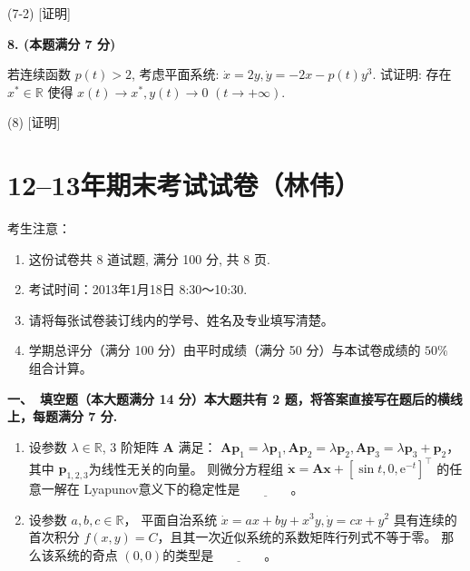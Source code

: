 (7-2) [证明]

\textbf{8. (本题满分 7 分) }

若连续函数 $p(t)>2$, 考虑平面系统: $\dot{x}=2 y, \dot{y}=-2 x-p(t) y^{3}$. 
试证明: 存在 $x^{*} \in \mathbb{R}$ 使得 $x(t) \rightarrow x^{*}, y(t) \rightarrow 0$ $(t \rightarrow+\infty)$.

(8) [证明]

\section{12--13年期末考试试卷（林伟）}

考生注意：
\begin{enumerate}
\item 这份试卷共 8 道试题, 满分 100 分, 共 8 页.
\item 考试时间：2013年1月18日 8:30～10:30.
\item 请将每张试卷装订线内的学号、姓名及专业填写清楚。
\item 学期总评分（满分 100 分）由平时成绩（满分 50 分）与本试卷成绩的 $50 \%$ 组合计算。
\end{enumerate}

\textbf{一、\ 填空题（本大题满分 14 分）本大题共有 2 题，将答案直接写在题后的横线上，每题满分 7 分.}
\begin{enumerate}
\item 设参数 $\lambda \in \mathbb{R}$, $3$ 阶矩阵 $\boldsymbol{A}$ 满足：
$\boldsymbol{A} \boldsymbol{p}_{1}=\lambda \boldsymbol{p}_{1}, 
\boldsymbol{A} \boldsymbol{p}_{2}=\lambda \boldsymbol{p}_{2}, 
\boldsymbol{A} \boldsymbol{p}_{3}=\lambda \boldsymbol{p}_{3}+\boldsymbol{p}_{2}$，
其中 $\boldsymbol{p}_{1,2,3}$为线性无关的向量。
则微分方程组 $\dot{\boldsymbol{x}}=\boldsymbol{A} \boldsymbol{x}+\left[\sin t, 0, \mathrm{e}^{-t}\right]^{\top}$ 的任意一解在 Lyapunov意义下的稳定性是$\underline{\qquad\qquad}$。

\item 设参数 $a, b, c \in \mathbb{R}$，
平面自治系统 $\dot{x}=a x+b y+x^{3} y, \dot{y}=c x+y^{2}$ 
具有连续的首次积分 $f(x, y)=C$，且其一次近似系统的系数矩阵行列式不等于零。
那么该系统的奇点 $(0,0)$的类型是$\underline{\qquad\qquad}$。
\end{enumerate}


